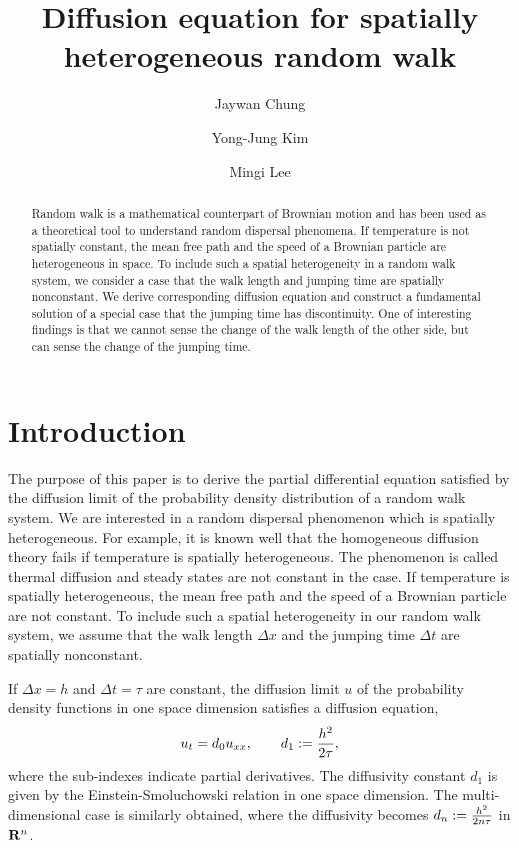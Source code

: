 \documentclass[11pt]{amsart}
\title[Random walk with location dependent travelling time]{Diffusion equation for spatially heterogeneous random walk}%
\author[Jaywan Chung]{Jaywan Chung}
\author[Yong-Jung Kim]{Yong-Jung Kim}
\author[Mingi Lee]{Mingi Lee}
\def\R{{\bf R}}
\def\R{{\bf R}}
\begin{document}
\maketitle
%
\begin{abstract}
  Random walk is a mathematical counterpart of Brownian motion and has been used as a theoretical tool to understand random dispersal phenomena. If temperature is not spatially constant, the mean free path and the speed of a Brownian particle are heterogeneous in space. To include such a spatial heterogeneity in a random walk system, we consider a case that the walk length and jumping time are spatially nonconstant. We derive corresponding diffusion equation and construct a fundamental solution of a special case that the jumping time has discontinuity. One of interesting findings is that we cannot sense the change of the walk length of the other side, but can sense the change of the jumping time.
\end{abstract}




\section{Introduction}

The purpose of this paper is to derive the partial differential equation satisfied by the diffusion limit of the probability density distribution of a random walk system. We are interested in a random dispersal phenomenon which is spatially heterogeneous. For example, it is known well that the homogeneous diffusion theory fails if temperature is spatially heterogeneous. The phenomenon is called thermal diffusion and steady states are not constant in the case. If temperature is spatially heterogeneous, the mean free path and the speed of a Brownian particle are not constant. To include such a spatial heterogeneity in our random walk system, we assume that the walk length $\Delta x$ and the jumping time $\Delta t$ are spatially nonconstant.

If $\Delta x=h$ and $\Delta t=\tau$ are constant, the diffusion limit $u$ of the probability density functions in one space dimension satisfies a diffusion equation,
\begin{equation}\label{HomoDiffusion}
u_t=d_0u_{xx},\qquad d_1:={h^2\over 2\tau},
\end{equation}
where the sub-indexes indicate partial derivatives. The diffusivity constant $d_1$ is given by the Einstein-Smoluchowski relation in one space dimension. The multi-dimensional case is similarly obtained, where the diffusivity becomes $d_n:={h^2\over 2n\tau}$ in $\R^n$.
\end{document}
